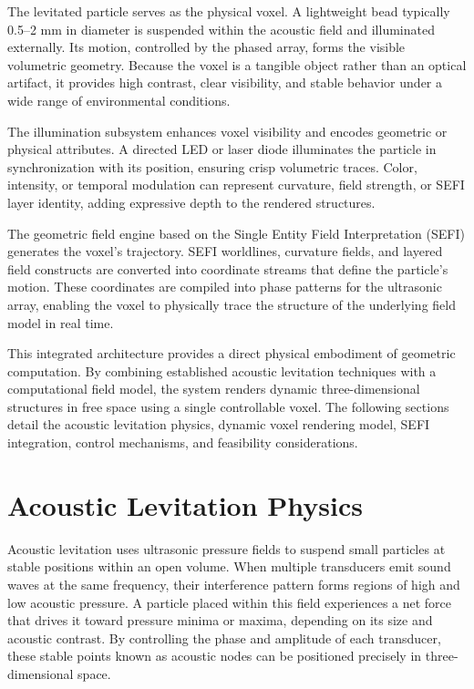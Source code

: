 \documentclass[10pt,twocolumn]{article}
\begin{document}
The levitated particle serves as the physical voxel. A lightweight bead typically 0.5--2 mm in diameter is suspended within the acoustic field and illuminated externally. Its motion, controlled by the phased array, forms the visible volumetric geometry. Because the voxel is a tangible object rather than an optical artifact, it provides high contrast, clear visibility, and stable behavior under a wide range of environmental conditions.

The illumination subsystem enhances voxel visibility and encodes geometric or physical attributes. A directed LED or laser diode illuminates the particle in synchronization with its position, ensuring crisp volumetric traces. Color, intensity, or temporal modulation can represent curvature, field strength, or SEFI layer identity, adding expressive depth to the rendered structures.

The geometric field engine based on the Single Entity Field Interpretation (SEFI) generates the voxel's trajectory. SEFI worldlines, curvature fields, and layered field constructs are converted into coordinate streams that define the particle's motion. These coordinates are compiled into phase patterns for the ultrasonic array, enabling the voxel to physically trace the structure of the underlying field model in real time.

This integrated architecture provides a direct physical embodiment of geometric computation. By combining established acoustic levitation techniques with a computational field model, the system renders dynamic three-dimensional structures in free space using a single controllable voxel. The following sections detail the acoustic levitation physics, dynamic voxel rendering model, SEFI integration, control mechanisms, and feasibility considerations.
\section{Acoustic Levitation Physics}
Acoustic levitation uses ultrasonic pressure fields to suspend small particles at stable positions within an open volume. When multiple transducers emit sound waves at the same frequency, their interference pattern forms regions of high and low acoustic pressure. A particle placed within this field experiences a net force that drives it toward pressure minima or maxima, depending on its size and acoustic contrast. By controlling the phase and amplitude of each transducer, these stable points known as acoustic nodes can be positioned precisely in three-dimensional space.
\end{document}
